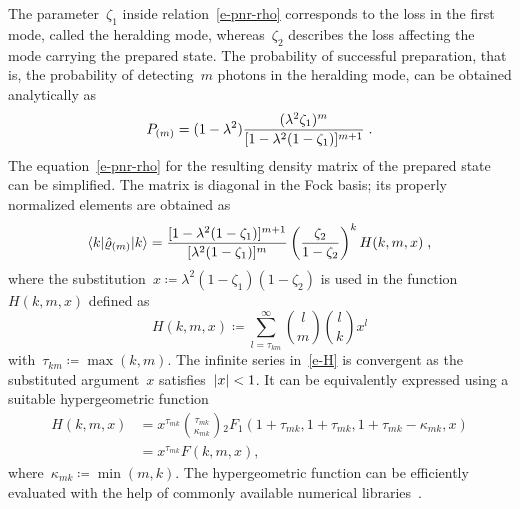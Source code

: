 \documentclass{optica-article}
\begin{document}
The parameter~$\zeta_{1}$ inside relation~\eqref{e-pnr-rho} corresponds to the loss in the first mode, called the heralding mode, whereas~$\zeta_{2}$ describes the loss affecting the mode carrying the prepared state. The probability of successful preparation, that is, the probability of detecting~$m$ photons in the heralding mode, can be obtained analytically as
%
\begin{equation}\label{e-pnr-pro}
  P_{(m)} = (1 - \lambda^{2}) 
  \frac
    { (\lambda^{2} \zeta_{1})^{m} }
    { [ 1 - \lambda^{2} (1 - \zeta_{1}) ]^{m + 1} } \;\text{.}
\end{equation}
%
The equation~\eqref{e-pnr-rho} for the resulting density matrix of the prepared state can be simplified. The matrix is diagonal in the Fock basis; its properly normalized elements are obtained as
%
\begin{equation}\label{e-pnr-rho-kk}
  \braket{ k | \hat{\varrho}_{(m)} | k } =
  \frac
    { [ 1 - \lambda^{2} (1 - \zeta_{1}) ]^{m + 1} }
    { [ \lambda^{2} (1 - \zeta_{1}) ]^{m} }
  \left( \frac{ \zeta_{2} }{ 1 - \zeta_{2} } \right)^{k}
  H (k, m, x) \;\text{,}
\end{equation}
%
where the substitution~${x \coloneqq \lambda^{2} ( 1 - \zeta_{1} )(1 - \zeta_{2} )}$ is used in the function~$H(k, m, x)$ defined as
%
\begin{equation}\label{e-H}
  H(k, m, x) \coloneq
  \sum\limits_{l = \tau_{km}}^{\infty}
    \binom{l}{m}
    \binom{l}{k}
    x^{l} 
\end{equation}
%
with~${\tau_{km} \coloneqq \max(k, m)}$. The infinite series in~\eqref{e-H} is convergent as the substituted argument~$x$ satisfies~${\lvert x \rvert < 1}$. It can be equivalently expressed using a suitable hypergeometric function~\cite{bateman1981}
%
\begin{equation}
  \begin{aligned}
    H(k, m, x) & =
    x^{\tau_{mk}} 
    \binom
      {\tau_{mk}}
      {\kappa_{mk}}
    {}_{2}F_{1} (
      1 + \tau_{mk},
      1 + \tau_{mk},
      1 + \tau_{mk} - \kappa_{mk},
      x
    ) \\
    & =
    x^{\tau_{mk}} F(k, m, x),
  \end{aligned}
\end{equation}
%
where~${\kappa_{mk} \coloneqq \min (m, k)}$. The hypergeometric function can be efficiently evaluated with the help of commonly available numerical libraries~\cite{virtanen2020}. 
\end{document}
